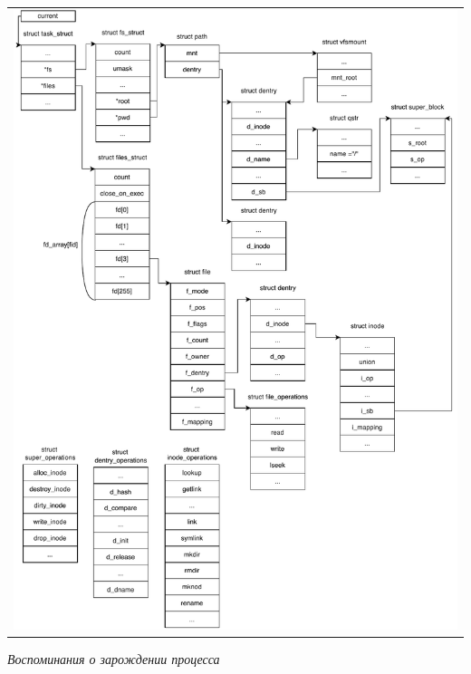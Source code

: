 \begin{table}[H]
  \centering
  \begin{tabular}{p{1\linewidth}}
    \centering
    \includegraphics[width=0.8\linewidth]{./images/struct_connect_proc.pdf}
  \end{tabular}
\end{table}

\textit{Воспоминания о зарождении процесса}

